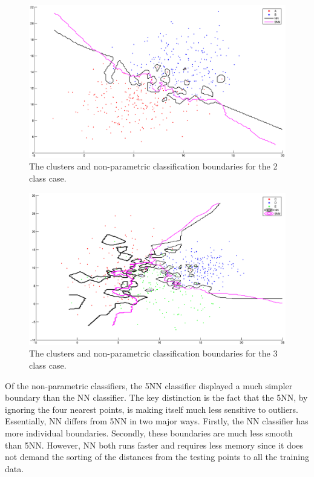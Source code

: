 \begin{figure}
  \begin{center}
  	\label{fig:2nonparam}  
    \caption{The clusters and non-parametric classification
    boundaries for the 2 class case.}
    \includegraphics[width=15cm]{figures/2-nonparam}
  \end{center}
\end{figure}

\begin{figure}
  \begin{center}
  	\label{fig:3nonparam}
    \caption{The clusters and non-parametric classification
    boundaries for the 3 class case.}
    \includegraphics[width=15cm]{figures/3-nonparam}
  \end{center}
\end{figure}

Of the non-parametric classifiers, the 5NN classifier displayed a much simpler 
boundary than the NN classifier.  The key distinction is the fact that the 5NN,
by ignoring the four nearest points, is making itself much less sensitive to 
outliers. Essentially, NN differs from 5NN in two major ways. Firstly, the NN 
classifier has more individual boundaries. Secondly, these boundaries are much 
less smooth than 5NN. However, NN both runs faster and requires less memory 
since it does not demand the sorting of the distances from the testing points 
to all the training data.

